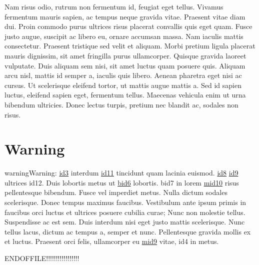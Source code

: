 \sphinxAtStartPar
Nam risus odio, rutrum non fermentum id, feugiat eget tellus. Vivamus fermentum mauris sapien, ac
tempus neque gravida vitae. Praesent vitae diam dui. Proin commodo purus ultrices risus placerat
convallis quis eget quam. Fusce justo augue, suscipit ac libero eu, ornare accumsan massa. Nam
iaculis mattis consectetur. Praesent tristique sed velit et aliquam. Morbi pretium ligula placerat
mauris dignissim, sit amet fringilla purus ullamcorper. Quisque gravida laoreet vulputate. Duis
aliquam sem nisi, sit amet luctus quam posuere quis. Aliquam arcu nisl, mattis id semper a, iaculis
quis libero. Aenean pharetra eget nisi ac cursus. Ut scelerisque eleifend tortor, ut mattis augue
mattis a. Sed id sapien luctus, eleifend sapien eget, fermentum tellus. Maecenas vehicula enim ut
urna bibendum ultricies. Donec lectus turpis, pretium nec blandit ac, sodales non risus.


\section{Warning}
\label{\detokenize{test:warning}}
\begin{sphinxadmonition}{warning}{Warning:}
\sphinxAtStartPar
\hyperlink{\detokenize{id3}}{id3} interdum \hyperlink{\detokenize{id11}}{id11} tincidunt quam lacinia euismod.
\hyperlink{\detokenize{id8}}{id8} \hyperlink{\detokenize{id9}}{id9} ultrices \hypertarget{\detokenize{id12}}{id12}. Duis lobortis
metus ut \hyperlink{\detokenize{bid6}}{\hypertarget{\detokenize{bid6-ref46}}{bid6}} lobortis. \hypertarget{\detokenize{bid7}}{bid7} in lorem
\hyperlink{\detokenize{test-mid10-id0}}{\hypertarget{\detokenize{test-mid10-id1}}{mid10}} risus pellentesque bibendum. Fusce vel
imperdiet metus. Nulla dictum sodales scelerisque. Donec tempus maximus faucibus. Vestibulum ante
ipsum primis in faucibus orci luctus et ultrices posuere cubilia curae; Nunc non molestie tellus.
Suspendisse ac est sem. Duis interdum nisi eget justo mattis scelerisque. Nunc tellus lacus, dictum
ac tempus a, semper et nunc. Pellentesque gravida mollis ex et luctus. Praesent orci felis,
ullamcorper eu \hyperlink{\detokenize{test-mid9-id0}}{\hypertarget{\detokenize{test-mid9-id1}}{mid9}} vitae, \hypertarget{\detokenize{id4}}{id4} in metus.
\end{sphinxadmonition}

\sphinxAtStartPar
ENDOFFILE!!!!!!!!!!!!!!!!!

\sphinxstepscope


